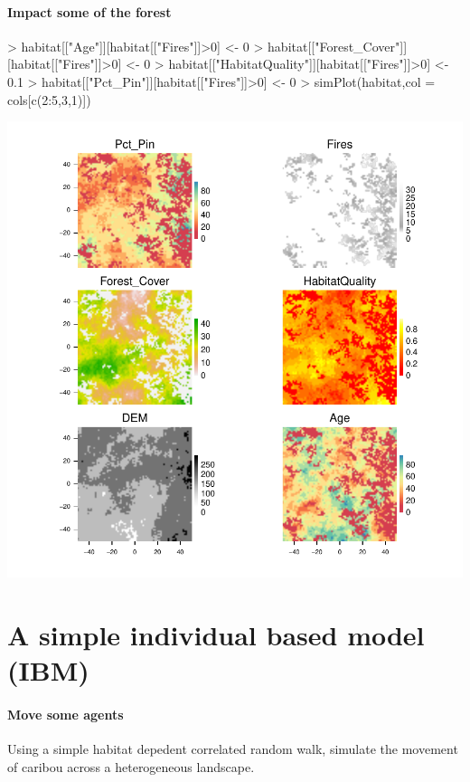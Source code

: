 \documentclass{article}
\begin{document}
\paragraph{Impact some of the forest}
\begin{Schunk}
\begin{Sinput}
> habitat[["Age"]][habitat[["Fires"]]>0] <- 0
> habitat[["Forest_Cover"]][habitat[["Fires"]]>0] <- 0
> habitat[["HabitatQuality"]][habitat[["Fires"]]>0] <- 0.1
> habitat[["Pct_Pin"]][habitat[["Fires"]]>0] <- 0
> simPlot(habitat,col = cols[c(2:5,3,1)])
\end{Sinput}
\end{Schunk}
\includegraphics{introduction-Fire-impacts-maps}

\section{A simple individual based model (IBM)}
\paragraph{Move some agents}
Using a simple habitat depedent correlated random walk, simulate the movement of caribou across a heterogeneous landscape. 
\end{document}
